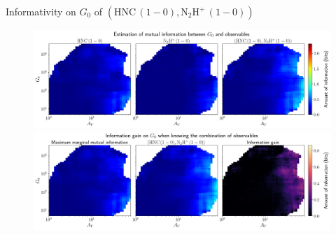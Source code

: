 \documentclass{beamer}
\begin{document}
\begin{frame}{Informativity on $G_0$ of $\left(\mathrm{HNC\,(1-0)},\mathrm{N_2H^+\,(1-0)}\right)$}
    \begin{figure}
        \centering
        \includegraphics[width=0.95\linewidth]{../mi/g0__hnc10_n2hp10_mi.png}
        \vfill
        \includegraphics[width=0.95\linewidth]{../mi/g0__hnc10_n2hp10_mi_gain.png}
    \end{figure}
\end{frame}
\end{document}
